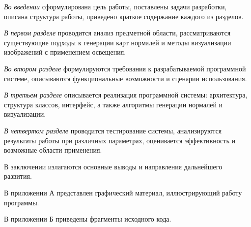 \emph{Во введении} сформулирована цель работы, поставлены задачи разработки, описана структура работы, приведено краткое содержание каждого из разделов.

\emph{В первом разделе} проводится анализ предметной области, рассматриваются существующие подходы к генерации карт нормалей и методы визуализации изображений с применением освещения.

\emph{Во втором разделе} формулируются требования к разрабатываемой программной системе, описываются функциональные возможности и сценарии использования.

\emph{В третьем разделе} описывается реализация программной системы: архитектура, структура классов, интерфейс, а также алгоритмы генерации нормалей и визуализации.

\emph{В четвертом разделе} проводится тестирование системы, анализируются результаты работы при различных параметрах, оценивается эффективность и возможные области применения.

В заключении излагаются основные выводы и направления дальнейшего развития.

В приложении А представлен графический материал, иллюстрирующий работу программы.
  
В приложении Б приведены фрагменты исходного кода.

